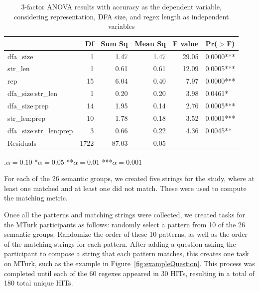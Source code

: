 \begin{table}[t]
\centering
\caption{3-factor ANOVA results with accuracy as the dependent variable, considering representation, DFA size, and regex length as independent variables}
\begin{tabular}{@{}l@{}rrrrl@{}}
  \hline
 & Df & Sum Sq & Mean Sq & F value & Pr($>$F) \\ 
  \hline
dfa\_size              & 1 & 1.47 & 1.47 & 29.05 & 0.0000*** \\ 
  str\_len               & 1 & 0.61 & 0.61 & 12.09 & 0.0005*** \\ 
  rep                  & 15 & 6.04 & 0.40 & 7.97 & 0.0000*** \\ 
  dfa\_size:str\_len      & 1 & 0.20 & 0.20 & 3.98 & 0.0461* \\ 
  dfa\_size:prep         & 14 & 1.95 & 0.14 & 2.76 & 0.0005*** \\ 
  str\_len:prep          & 10 & 1.78 & 0.18 & 3.52 & 0.0001*** \\ 
  dfa\_size:str\_len:prep & 3 & 0.66 & 0.22 & 4.36 & 0.0045** \\ 
  Residuals             & 1722 & 87.03 & 0.05 &  &  \\ 
   \hline
\end{tabular}

\vspace{3pt}
.$\alpha = 0.10$ \hspace{3pt} *$\alpha=0.05$ \hspace{3pt} **$\alpha=0.01$ \hspace{3pt} ***$\alpha=0.001$
\label{table:anova}
\end{table}

For each of the 26 semantic groups, we created five strings for the study, where at least one matched and at least one did not match. These were used to compute the matching metric.

Once all the patterns and matching strings were collected, we created tasks for the MTurk participants as follows:
randomly select a pattern from 10 of the 26 semantic groups. Randomize the order of these 10 patterns, as well as the order of the matching strings for each pattern. After adding a question asking the participant to compose a string that each pattern matches, this creates one task on MTurk, such as the example in Figure~\ref{fig:exampleQuestion}.   This process was completed until each of the 60 regexes appeared in 30 HITs, resulting in a total of 180 total unique HITs.


